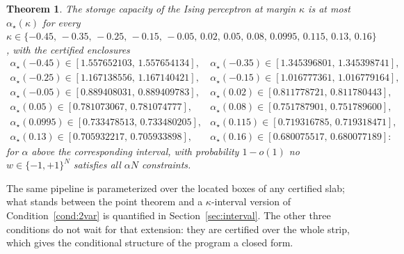 \documentclass[11pt]{article}
\newtheorem{theorem}{Theorem}
\theoremstyle{remark}
\begin{document}
\begin{theorem}\label{thm:main}
The storage capacity of the Ising perceptron at margin $\kappa$ is at
most $\alpha_\star(\kappa)$ for every
$\kappa\in\{-0.45,\,-0.35,\,-0.25,\,-0.15,\,-0.05,\,0.02,\,
0.05,\,0.08,\,0.0995,\,0.115,\,0.13,\,0.16\}$, with the certified enclosures
\[
\begin{array}{ll}
\alpha_\star(-0.45)\in[1.557652103,\,1.557654134], &
\alpha_\star(-0.35)\in[1.345396801,\,1.345398741],\\
\alpha_\star(-0.25)\in[1.167138556,\,1.167140421], &
\alpha_\star(-0.15)\in[1.016777361,\,1.016779164],\\
\alpha_\star(-0.05)\in[0.889408031,\,0.889409783], &
\alpha_\star(0.02)\in[0.811778721,\,0.811780443],\\
\alpha_\star(0.05)\in[0.781073067,\,0.781074777], &
\alpha_\star(0.08)\in[0.751787901,\,0.751789600],\\
\alpha_\star(0.0995)\in[0.733478513,\,0.733480205], &
\alpha_\star(0.115)\in[0.719316785,\,0.719318471],\\
\alpha_\star(0.13)\in[0.705932217,\,0.705933898], &
\alpha_\star(0.16)\in[0.680075517,\,0.680077189]:
\end{array}
\]
for $\alpha$ above the corresponding interval, with probability
$1-o(1)$ no $w\in\{-1,+1\}^N$ satisfies all $\alpha N$ constraints.
\end{theorem}

The same pipeline is parameterized over the located boxes of any
certified slab; what stands between the point theorem and a
$\kappa$-interval version of Condition~\ref{cond:2var} is quantified
in Section~\ref{sec:interval}.  The other three conditions do not
wait for that extension: they are certified over the whole strip,
which gives the conditional structure of the program a closed form.
\end{document}
